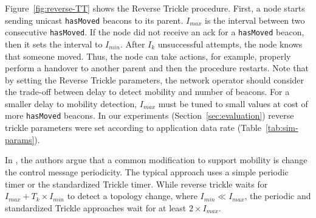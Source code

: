Figure~\ref{fig:reverse-TT} shows the Reverse Trickle procedure. First, a node starts sending unicast \texttt{hasMoved} beacons to its parent. $I_{max}$ is the interval between two consecutive \texttt{hasMoved}. If the node did not receive an ack for a \texttt{hasMoved} beacon, then it sets the interval to $I_{min}$. After $I_k$ unsuccessful attempts, the node knows that someone moved. Thus, the node can take actions, for example, properly perform a handover to another parent and then the procedure restarts. Note that by setting the Reverse Trickle parameters, the network operator should consider the trade-off between delay to detect mobility and number of beacons. For a smaller delay to mobility detection, $I_{max}$ must be tuned to small values at cost of more \texttt{hasMoved} beacons. In our experiments (Section~\ref{sec:evaluation}) reverse trickle parameters were set according to application data rate (Table~\ref{tab:sim-params}). 

In \cite{oliveira2016low}, the authors argue that a common modification to support mobility is change the control message periodicity. The typical approach uses a simple periodic timer or the standardized Trickle timer. While reverse trickle waits for $I_{max} + T_k \times I_{min}$ to detect a topology change, where $I_{min} \ll I_{max}$, the periodic and standardized Trickle approaches wait for at least $2\times I_{max}$.  